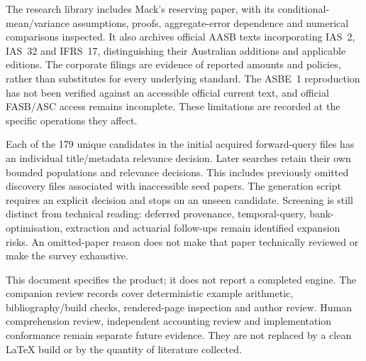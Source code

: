 The research library includes Mack's reserving paper, with its conditional-mean/variance
assumptions, proofs, aggregate-error dependence and numerical comparisons
inspected. It also archives official AASB texts incorporating IAS~2, IAS~32
and IFRS~17, distinguishing their Australian additions and applicable editions.
The corporate filings are evidence of reported amounts and policies, rather
than substitutes for every underlying standard. The ASBE~1 reproduction has
not been verified against an accessible official current text, and official
FASB/ASC access remains incomplete. These limitations are recorded at the
specific operations they affect.

Each of the 179 unique candidates in the initial acquired forward-query
files has an individual title/metadata relevance decision. Later searches
retain their own bounded populations and relevance decisions. This includes
previously omitted discovery files associated with inaccessible seed papers.
The generation script requires an explicit decision and stops on an unseen
candidate. Screening is still distinct from technical reading: deferred
provenance, temporal-query, bank-optimisation, extraction and actuarial
follow-ups remain identified expansion risks. An omitted-paper reason does
not make that paper technically reviewed or make the survey exhaustive.

This document specifies the product; it does not report a completed engine.
The companion review records cover deterministic example arithmetic,
bibliography/build checks, rendered-page inspection and author review. Human
comprehension review, independent accounting review and implementation
conformance remain separate future evidence. They are not replaced by a clean
LaTeX build or by the quantity of literature collected.
